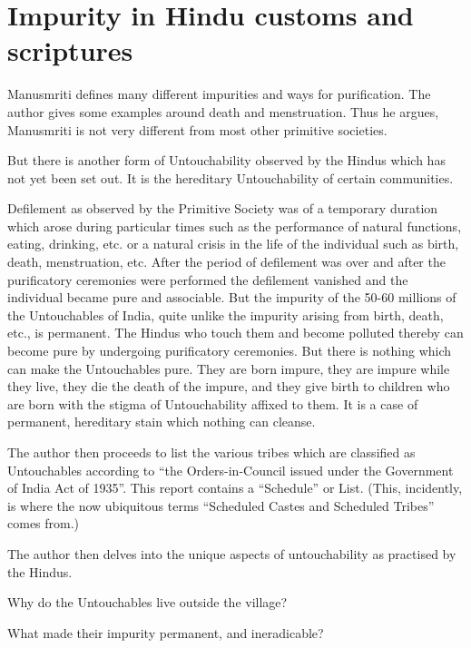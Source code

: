 \documentclass{article}
\begin{document}
\section{Impurity in Hindu customs and scriptures}
Manusmriti defines many different impurities and ways for purification. The author gives some examples around death and menstruation. Thus he argues, Manusmriti is not very different from most other primitive societies.

\begin{shadequote}
But there is another form of Untouchability observed by the Hindus which has not yet been set out. It is the hereditary Untouchability of certain communities.

Defilement as observed by the Primitive Society was of a temporary duration which arose during particular times such as the performance of natural functions, eating, drinking, etc. or a natural crisis in the life of the individual such as birth, death, menstruation, etc. After the period of defilement was over and after the purificatory ceremonies were performed the defilement vanished and the individual became pure and associable. But the impurity of the 50-60 millions of the Untouchables of India, quite unlike the impurity arising from birth, death, etc., is permanent. The Hindus who touch them and become polluted thereby can become pure by undergoing purificatory ceremonies. But there is nothing which can make the Untouchables pure. They are born impure, they are impure while they live, they die the death of the impure, and they give birth to children who are born with the stigma of Untouchability affixed to them. It is a case of permanent, hereditary stain which nothing can cleanse.
\end{shadequote}

The author then proceeds to list the various tribes which are classified as Untouchables according to ``the Orders-in-Council issued under the Government of India Act of 1935''. This report contains a ``Schedule'' or List. (This, incidently, is where the now ubiquitous terms ``Scheduled Castes and Scheduled Tribes'' comes from.)

The author then delves into the unique aspects of untouchability as practised by the Hindus. 

\begin{shadequote}
\item Why do the Untouchables live outside the village?
\item What made their impurity permanent, and ineradicable?
\end{shadequote}
\end{document}
